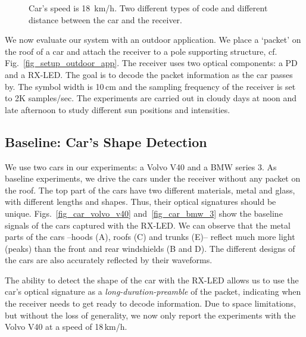 \documentclass[10pt]{sig-alternate-05-2015}
\begin{document}
\begin{figure*}[t]
	\hfill
	\hfill
	\vspace{-2mm}
	\caption {Car's speed is 18~km/h. Two different types of code and different distance between the car and the receiver.}
	\vspace{-2mm}
	\label{fig_speed100cmLEDID1}
\end{figure*}

We now evaluate our system with an outdoor application. We place a `packet' on the roof of a car and attach the receiver to a pole supporting structure, cf. Fig.~\ref{fig_setup_outdoor_app}. The receiver uses two optical components: a PD and a RX-LED. The goal is to decode the packet information as the car passes by. The symbol width is 10\,cm and the sampling frequency of the receiver is set to 2K samples/sec. The experiments are carried out in cloudy days at noon and late afternoon {to study different sun positions and intensities}.

\subsection{Baseline: Car's Shape Detection}

We use two cars in our experiments: a Volvo V40 and a BMW series 3. As baseline experiments, we drive the cars under the receiver without any packet on the roof. The top part of the cars have two different materials, metal and glass, with different lengths and shapes. Thus, their optical signatures should be unique. Figs.~\ref{fig_car_volvo_v40} and~\ref{fig_car_bmw_3} show the baseline signals of the cars captured with the RX-LED. We can observe that the metal parts of the cars --hoods (A), roofs (C) and trunks (E)-- reflect much more light (peaks) than the front and rear windshields (B and D). The different designs of the cars are also accurately reflected by their waveforms.

The ability to detect the shape of the car with the RX-LED allows us to use the car's optical signature as a {\it long-duration-preamble} of the packet, indicating when the receiver needs to get ready to decode information. 
Due to space limitations, {but without the loss of generality}, we now only report the experiments with the Volvo V40 at a  speed of 18\,km/h. 
\end{document}
